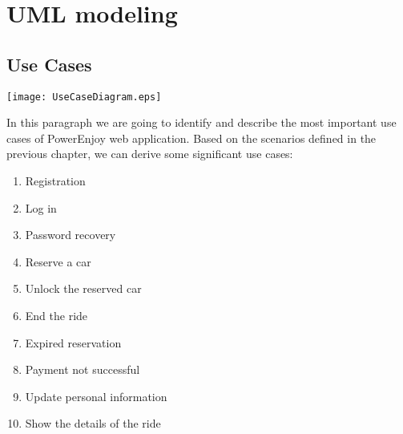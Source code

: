 \pagebreak
\section{UML modeling}
\subsection{Use Cases}
\centerline{
	\vspace{0.4in}
		\texttt{[image: UseCaseDiagram.eps]}}

\pagebreak

In this paragraph we are going to identify and describe the most important use cases of PowerEnjoy web application.
Based on the scenarios defined in the previous chapter, we can derive some significant use cases:
\begin{enumerate}
	\item Registration
	\item Log in
	\item Password recovery
	\item Reserve a car
	\item Unlock the reserved car
	\item End the ride
	\item Expired reservation
	\item Payment not successful
	\item Update personal information
	\item Show the details of the ride
\end{enumerate}

\newtoggle{exception}
\newenvironment{UseCase}[5]{
	\paragraph{Partecipating actors:} #1
	\paragraph{Entry condition:} #2
	\paragraph{Flow of events:}
	\begin{itemize} 
		#3 
	\end{itemize}
	\paragraph{Exit condition:} #4
	\iftoggle{exception}{
		\paragraph{Exceptions:}
		\begin{itemize}
			#5
		\end{itemize}
	}{
	}
}{}


